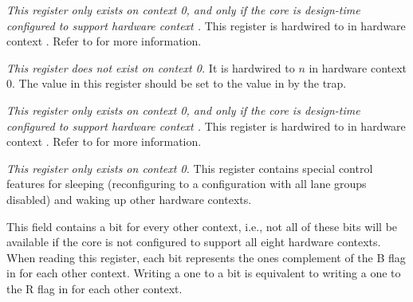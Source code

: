 
\emph{This register only exists on context 0, and only if the core is
design-time configured to support hardware context \n{}.} This register is 
hardwired to  in hardware context \n{}. Refer to  for more
information.

\coreCanWrite{}
\debugCanWrite{}


\emph{This register does not exist on context 0.} It is hardwired to
$n$ in hardware context 0. The value in this register should be set
to the value in  by the  trap.

\coreCanWrite{}
\debugCanWrite{}


\emph{This register only exists on context 0, and only if the core is
design-time configured to support hardware context \n{}.} This register is 
hardwired to  in hardware context \n{}. Refer to  for more
information.



\emph{This register only exists on context 0.} This register contains special 
control features for sleeping (reconfiguring to a configuration with all lane 
groups disabled) and waking up other hardware contexts.

\debugCanWrite{}
\coreCanWrite{}
This field contains a bit for every other context, i.e., not all of these bits
will be available if the core is not configured to support all eight hardware
contexts. When reading this register, each bit represents the ones complement
of the B flag in  for each other context. Writing a one to a bit is
equivalent to writing a one to the R flag in  for each other context.

